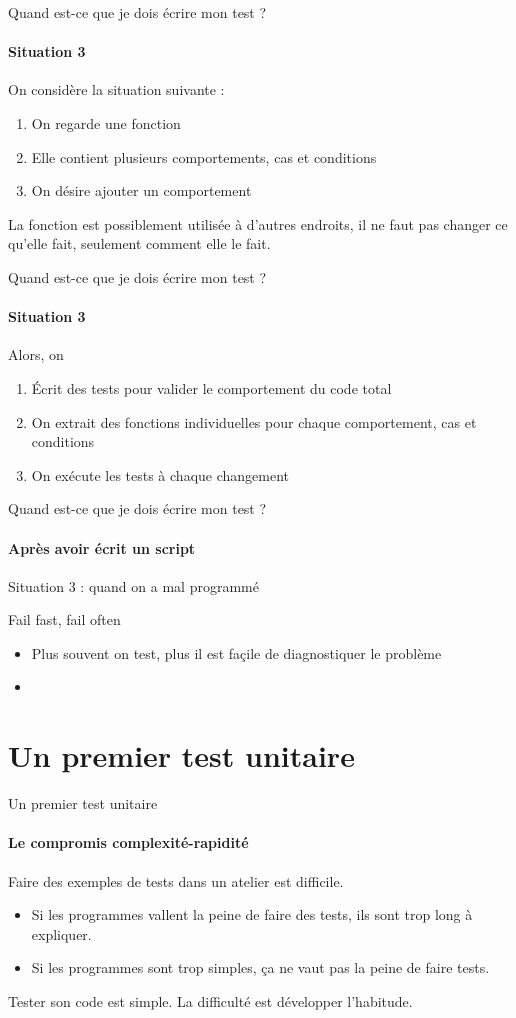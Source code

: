 \documentclass[11pt]{beamer}
\begin{document}
\begin{frame}{Quand est-ce que je dois écrire mon test ?}
\framesubtitle{Situation 3}
On considère la situation suivante : 
\begin{enumerate}
\item On regarde une fonction
\item Elle contient plusieurs comportements, cas et conditions
\item On désire ajouter un comportement
\end{enumerate}
La fonction est possiblement utilisée à d'autres endroits, il ne faut pas changer ce qu'elle fait, seulement comment elle le fait. 
\end{frame}

\begin{frame}{Quand est-ce que je dois écrire mon test ?}
\framesubtitle{Situation 3}
Alors, on 
\begin{enumerate}
\item Écrit des tests pour valider le comportement du code total
\item On extrait des fonctions individuelles pour chaque comportement, cas et conditions
\item On exécute les tests à chaque changement
\end{enumerate}
\end{frame}

\begin{frame}{Quand est-ce que je dois écrire mon test ?}
\framesubtitle{Après avoir écrit un script}
Situation 3 : quand on a mal programmé
\begin{block}{}
Fail fast, fail often
\end{block}
\begin{itemize}
\item Plus souvent on test, plus il est façile de diagnostiquer le problème
\item 
\end{itemize}
\end{frame}

\section{Un premier test unitaire} %

\begin{frame}{Un premier test unitaire} %
\framesubtitle{Le compromis complexité-rapidité}
Faire des exemples de tests dans un atelier est difficile. 
\begin{itemize}
\item Si les programmes vallent la peine de faire des tests, ils sont trop long à expliquer. 
\item Si les programmes sont trop simples, ça ne vaut pas la peine de faire tests.
\end{itemize}

Tester son code est simple. La difficulté est développer l'habitude. 
\end{frame}
\end{document}
